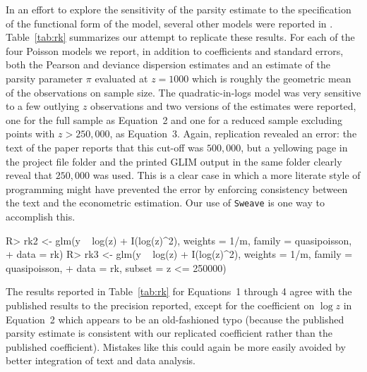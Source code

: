 \documentclass[10pt,a4paper,twoside]{article}
\let\code=\texttt
\let\proglang=\textsf
\newenvironment{Schunk}{}{}
\begin{document}
In an effort to explore the sensitivity of the parsity estimate to the specification of the
functional form of the model, several other models were reported in 
\cite{repro:Koenker:1988}.  Table~\ref{tab:rk} summarizes our attempt to replicate
these results.  For each of the four Poisson models we report, in addition to
coefficients and standard errors, both the Pearson and deviance dispersion estimates
and an estimate of the parsity parameter  $\pi$ evaluated at $z = 1000$ which is
roughly the geometric mean of the observations on sample size.  The quadratic-in-logs
model was very sensitive to a few outlying $z$ observations and two versions of the
estimates were reported, one for the full sample as Equation~2 and one for a reduced
sample excluding points with $z > 250,000$, as Equation~3.  Again, replication 
revealed an error:  the text of the paper  reports that this cut-off was $500,000$,
but a yellowing page in the project file folder and the printed \proglang{GLIM}
output in the same folder clearly reveal that $250,000$ was used.  
This is a clear case in which a more
literate style of programming might have prevented the error by enforcing consistency
between the text and the econometric estimation.  Our use of \code{Sweave}  is one
way to accomplish this.
%
\begin{Schunk}
\begin{Sinput}
R> rk2 <- glm(y ~ log(z) + I(log(z)^2), weights = 1/m, family = quasipoisson,
+    data = rk)
R> rk3 <- glm(y ~ log(z) + I(log(z)^2), weights = 1/m, family = quasipoisson,
+    data = rk, subset = z <= 250000)
\end{Sinput}
\end{Schunk}
%
The results reported in Table~\ref{tab:rk}  for Equations~1 through 4 agree with the
published results to the precision reported, except for the coefficient on $\log z$
in Equation~2 which appears to be an old-fashioned typo (because the published parsity
estimate is consistent with our replicated coefficient rather than the published coefficient).
Mistakes like this could again be more easily avoided by better integration of text and data analysis.
\end{document}
